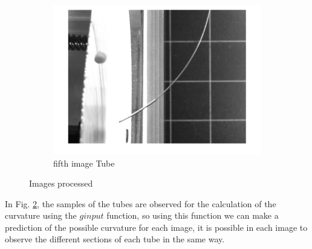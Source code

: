 \documentclass[12pt, twoside]{report}
\begin{document}
\begin{figure}[H]
\begin{subfigure}[b]{0.3\textwidth}
         \centering
         \includegraphics[width=\textwidth]{TP_1/curve5i.jpg}
         \caption{fifth image Tube}
         \label{fig:process5}
     \end{subfigure}
        \caption{Images processed}
        \label{fig:process}
\end{figure}
In Fig. \ref{fig:process}, the samples of the tubes are observed for the calculation of the curvature using the $ginput$ function, so using this function we can make a prediction of the possible curvature for each image, it is possible in each image to observe the different sections of each tube in the same way.
\end{document}
